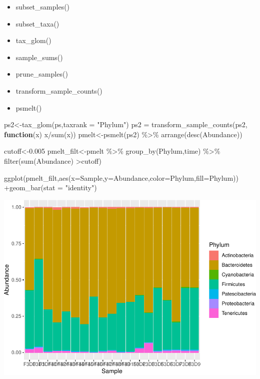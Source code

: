 \documentclass[
]{book}
\newenvironment{Shaded}{\begin{snugshade}}{\end{snugshade}}
\newcommand{\AttributeTok}[1]{\textcolor[rgb]{0.77,0.63,0.00}{#1}}
\newcommand{\ControlFlowTok}[1]{\textcolor[rgb]{0.13,0.29,0.53}{\textbf{#1}}}
\newcommand{\FloatTok}[1]{\textcolor[rgb]{0.00,0.00,0.81}{#1}}
\newcommand{\FunctionTok}[1]{\textcolor[rgb]{0.00,0.00,0.00}{#1}}
\newcommand{\NormalTok}[1]{#1}
\newcommand{\OtherTok}[1]{\textcolor[rgb]{0.56,0.35,0.01}{#1}}
\newcommand{\SpecialCharTok}[1]{\textcolor[rgb]{0.00,0.00,0.00}{#1}}
\newcommand{\StringTok}[1]{\textcolor[rgb]{0.31,0.60,0.02}{#1}}
\providecommand{\tightlist}{%
  \setlength{\itemsep}{0pt}\setlength{\parskip}{0pt}}
\begin{document}
\begin{itemize}
\tightlist
\item
  subset\_samples()
\item
  subset\_taxa()
\item
  tax\_glom()
\item
  sample\_sums()
\item
  prune\_samples()
\item
  transform\_sample\_counts()
\item
  psmelt()
\end{itemize}

\begin{Shaded}
\begin{Highlighting}[]
\NormalTok{ps2}\OtherTok{\textless{}{-}}\FunctionTok{tax\_glom}\NormalTok{(ps,}\AttributeTok{taxrank =} \StringTok{"Phylum"}\NormalTok{)}
\NormalTok{ps2 }\OtherTok{=} \FunctionTok{transform\_sample\_counts}\NormalTok{(ps2, }\ControlFlowTok{function}\NormalTok{(x) x}\SpecialCharTok{/}\FunctionTok{sum}\NormalTok{(x))}
\NormalTok{pmelt}\OtherTok{\textless{}{-}}\FunctionTok{psmelt}\NormalTok{(ps2) }\SpecialCharTok{\%\textgreater{}\%} \FunctionTok{arrange}\NormalTok{(}\FunctionTok{desc}\NormalTok{(Abundance))}

\NormalTok{cutoff}\OtherTok{\textless{}{-}}\FloatTok{0.005}
\NormalTok{pmelt\_filt}\OtherTok{\textless{}{-}}\NormalTok{pmelt }\SpecialCharTok{\%\textgreater{}\%} \FunctionTok{group\_by}\NormalTok{(Phylum,time) }\SpecialCharTok{\%\textgreater{}\%} \FunctionTok{filter}\NormalTok{(}\FunctionTok{sum}\NormalTok{(Abundance) }\SpecialCharTok{\textgreater{}}\NormalTok{cutoff)}

\FunctionTok{ggplot}\NormalTok{(pmelt\_filt,}\FunctionTok{aes}\NormalTok{(}\AttributeTok{x=}\NormalTok{Sample,}\AttributeTok{y=}\NormalTok{Abundance,}\AttributeTok{color=}\NormalTok{Phylum,}\AttributeTok{fill=}\NormalTok{Phylum)) }\SpecialCharTok{+}\FunctionTok{geom\_bar}\NormalTok{(}\AttributeTok{stat =} \StringTok{"identity"}\NormalTok{)}
\end{Highlighting}
\end{Shaded}

\includegraphics{16sworkshop_files/figure-latex/unnamed-chunk-2-1.pdf}
\end{document}
